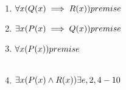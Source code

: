 \documentclass[12pt]{article}
\begin{document}
\begin{table}[H]
\begin{enumerate}
\item $ \forall x (Q(x) \implies R(x)) \hfill  premise$
\item $ \exists x (P(x) \implies Q(x)) \hfill  premise$
\item $ \forall x (P(x)) \hfill   premise$\\
\begin{tabular}{|p{10cm}|}
\hline
\item $ P(c) \implies Q(c) \hfill   assumed $
\item $ Q(c) \implies R(c) \hfill   \forall e,1$
\item $ P(c) \hfill   \forall e,3$
\item $ Q(c) \hfill   \implies e,4,6$
\item $ R(c) \hfill   \implies e,5,7$
\item $ P(c) \land R(c) \hfill   \land i,6,8$
\item $ \exists x (P(x) \land R(x))  \hfill   \exists i,9$\\
\hline
\end{tabular}
\item $ \exists x (P(x) \land R(x)) \hfill   \exists e,2,4-10$
\end{enumerate}
\end{table}
\end{document}
